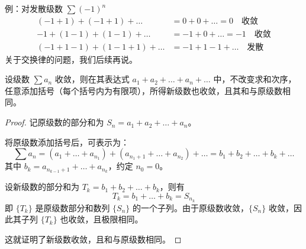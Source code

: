 例：对发散级数 $\sum (-1)^n$
\begin{align*}
	(-1+1)+(-1+1)+\dots &= 0+0+\dots = 0 \quad \text{收敛} \\
	-1+(1-1)+(1-1)+\dots &= -1+0+\dots = -1 \quad \text{收敛} \\
	(-1+1-1)+(1-1+1)+\dots &= -1+1-1+\dots \quad \text{发散}
\end{align*}
关于交换律的问题，我们后续再说。
\begin{proposition}
	设级数 $\sum a_n$ 收敛，则在其表达式 $a_1 + a_2 + \dots + a_n + \dots$ 中，不改变求和次序，任意添加括号（每个括号内为有限项），所得新级数也收敛，且其和与原级数相同。
\end{proposition}
\begin{proof}
	记原级数的部分和为 $S_n = a_1 + a_2 + \dots + a_n$。
	
	将原级数添加括号后，可表示为：
	\[
	\sum a_n = (a_1 + \dots + a_{n_1}) + (a_{n_1+1} + \dots + a_{n_2}) + \dots = b_1 + b_2 + \dots + b_k + \dots
	\]
	其中 $b_k = a_{n_{k-1}+1} + \dots + a_{n_k}$，约定 $n_0 = 0$。
	
	设新级数的部分和为 $T_k = b_1 + b_2 + \dots + b_k$，则有
	\[
	T_k = b_1 + \dots + b_k = S_{n_k}
	\]
	即 $\{T_k\}$ 是原级数部分和数列 $\{S_n\}$ 的一个子列。由于原级数收敛，$\{S_n\}$ 收敛，因此其子列 $\{T_k\}$ 也收敛，且极限相同。
	
	这就证明了新级数收敛，且和与原级数相同。
	
\end{proof}

